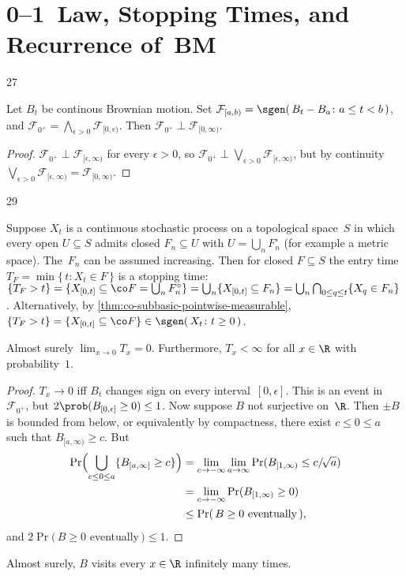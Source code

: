 \section	{0--1~Law, Stopping Times, and Recurrence of~BM}

\setcounter	{block}	{27}
\begin	{theorem}[0--1~law]
Let $B_t$ be continous Brownian motion.
Set \( \mathcal F_{[a,b)} = \sgen(\, B_t - B_a \colon a \le t < b \,) \),
and \( \mathcal F_{0^+} = \bigwedge_{\epsilon>0} \mathcal F_{[0,\epsilon)} \).
Then \( \mathcal F_{0^+} \perp \mathcal F_{[0,\infty)} \).
\end	{theorem}
\begin	{proof}
\( \mathcal F_{0^+} \perp \mathcal F_{[\epsilon,\infty)} \)
for every \( \epsilon > 0 \),
so \( \mathcal F_{0^+}
\perp \bigvee_{\epsilon>0} \mathcal F_{[\epsilon,\infty)} \),
but by continuity \( \bigvee_{\epsilon>0} \mathcal F_{[\epsilon,\infty)}
= \mathcal F_{[0,\infty)} \).
\end	{proof}

\setcounter	{block}	{29}
\begin	{remark}
Suppose $X_t$ is a continuous stochastic process
on a topological space~$S$
in which every open \( U \subseteq S \) admits closed \( F_n \subseteq U \)
with \( U = \bigcup_n F_n^\circ \)
(for example a metric space).
The~$F_n$ can be assumed increasing.
Then for closed \( F \subseteq S \)
the entry time \( T_F = \min\{\, t \colon X_t \in F \,\} \)
is a stopping time:
\(	\{ T_F > t \}
=	\{ X_{[0,t]} \subseteq \co F = \bigcup_n F_n^\circ \}
=	\bigcup_n \{ X_{[0,t]} \subseteq F_n \}
=	\bigcup_n \bigcap_{0\le q\le t} \{ X_q \in F_n \}
\).
Alternatively, by \autoref{thm:co-subbasic-pointwise-measurable},
\( \{T_F > t\} = \{X_{[0,t]} \subseteq \co F\}
\in \sgen(\, X_t \colon t \ge 0 \,) \).
\end	{remark}

\begin	{proposition}
Almost surely \( \lim_{x\to0} T_x = 0 \).
Furthermore, \( T_x < \infty \) for all \( x \in \R \)
with probability~$1$.
\end	{proposition}
\begin	{proof}
\( T_x \to 0 \) iff $B_t$ changes sign on every interval~$[0,\epsilon]$.
This is an event in~$\mathcal F_{0^+}$,
but \( 2\prob(B_{[0,\epsilon]} \ge 0) \le 1 \).
Now suppose $B$ not surjective on~$\R$.
Then \( \pm B \) is bounded from below,
or equivalently by compactness,
there exist \( c \le 0 \le a \) such that \( B_{[a,\infty)} \ge c \).
But
\begin	{align*}
	\Pr\Bigl( \bigcup_{c \le 0 \le a} \{ B_{[a,\infty]} \ge c \} \Bigr)
	&=	\lim_{c\to-\infty} \lim_{a\to\infty}
			\Pr( B_{[1,\infty)} \le c/\!\sqrt a ) \\
	&=	\lim_{c\to-\infty}
			\Pr( B_{[1,\infty)} \ge 0 ) \\
	&\le	\Pr(\,\text{\( B \ge 0 \) eventually}\,) \text,
\end	{align*}
and \( 2\Pr(\, B \ge 0 \) eventually\(\,) \le 1 \).
\end	{proof}

\begin	{corollary}
Almost surely, $B$ visits every \( x \in \R \) infinitely many times.
\end	{corollary}
